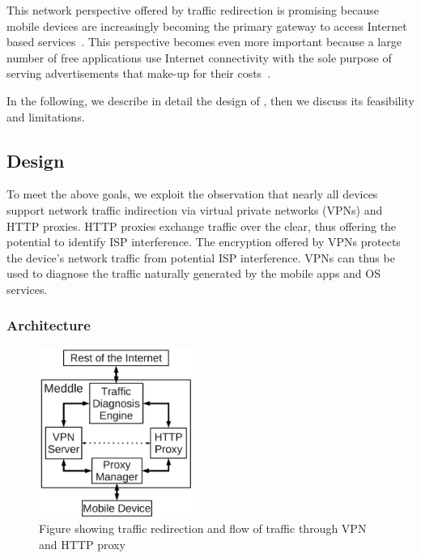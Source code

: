 This network perspective offered by traffic redirection is promising because mobile devices are increasingly becoming the primary gateway to access Internet based services~\cite{ict:facts}. 
This perspective becomes even more important because a large number of free applications use Internet connectivity with the sole purpose of serving advertisements that make-up for their costs~\cite{pathak:eprof,vallina-rodriguez:bfc}.


In the following, we describe in detail the design of \meddle, then we discuss its feasibility and limitations.

\subsection{Design}

To meet the above goals, we exploit the observation that nearly all devices support network traffic indirection via virtual private networks (VPNs) and HTTP proxies. 
HTTP proxies exchange traffic over the clear, thus offering the potential to identify ISP interference. 
The encryption offered by VPNs protects the device's network traffic from potential ISP interference.
VPNs can thus be used to diagnose the traffic naturally generated by the mobile apps and OS services. 


\subsubsection{Architecture}

\begin{figure}
\centering
\includegraphics[width=2in]{figures/Meddle-Design.pdf}
\caption{Figure showing traffic redirection and flow of traffic through VPN and HTTP proxy}
\label{fig:architecture}
\end{figure}

